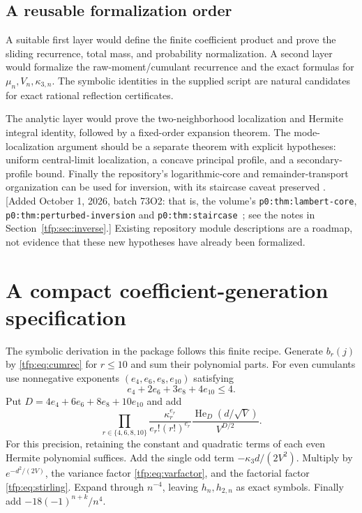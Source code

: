 \documentclass[11pt,a4paper]{article}
\numberwithin{equation}{section}
\theoremstyle{definition}\newtheorem{definition}[theorem]{Definition}
\theoremstyle{remark}\newtheorem{remark}[theorem]{Remark}
\newcommand{\He}{\operatorname{He}}
\begin{document}
\subsection{A reusable formalization order}
A suitable first layer would define the finite coefficient product and
prove the sliding recurrence, total mass, and probability
normalization. A second layer would formalize the raw-moment/cumulant
recurrence and the exact formulas for $\mu_n,V_n,\kappa_{3,n}$.
The symbolic identities in the supplied script are natural candidates
for exact rational reflection certificates.

The analytic layer would prove the two-neighborhood localization and
Hermite integral identity, followed by a fixed-order expansion theorem.
The mode-localization argument should be a separate theorem with
explicit hypotheses: uniform central-limit localization, a concave
principal profile, and a secondary-profile bound. Finally the
repository's logarithmic-core and remainder-transport organization can
be used for inversion, with its staircase caveat preserved
\cite{transseries}.
[Added October 1, 2026, batch 73O2: that is, the volume's
\texttt{p0:thm:lambert-core}, \texttt{p0:thm:perturbed-inversion} and
\texttt{p0:thm:staircase}~\cite{tai}; see the notes in
Section~\ref{tfp:sec:inverse}.] Existing repository module descriptions are a
roadmap, not evidence that these new hypotheses have already been
formalized.

\appendix
\section{A compact coefficient-generation specification}
The symbolic derivation in the package follows this finite recipe.
Generate $b_r(j)$ by \eqref{tfp:eq:cumrec} for $r\le10$ and sum their
polynomial parts. For even cumulants use nonnegative exponents
$(e_4,e_6,e_8,e_{10})$ satisfying
\begin{equation}
 e_4+2e_6+3e_8+4e_{10}\le4.
\end{equation}
Put $D=4e_4+6e_6+8e_8+10e_{10}$ and add
\begin{equation}
 \prod_{r\in\{4,6,8,10\}}
        \frac{\kappa_r^{e_r}}{e_r!(r!)^{e_r}}
   \frac{\He_D(d/\sqrt V)}{V^{D/2}}.
\end{equation}
For this precision, retaining the constant and quadratic terms of
each even Hermite polynomial suffices. Add the single odd term
$-\kappa_3d/(2V^2)$. Multiply by $e^{-d^2/(2V)}$, the variance factor
\eqref{tfp:eq:varfactor}, and the factorial factor \eqref{tfp:eq:stirling}.
Expand through $n^{-4}$, leaving $h_n,h_{2,n}$ as exact symbols.
Finally add $-18(-1)^{n+k}/n^4$.
\end{document}
